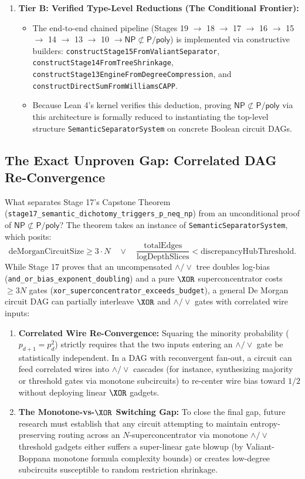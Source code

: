 \documentclass[11pt,a4paper]{article}
\theoremstyle{plain}
\theoremstyle{definition}
\theoremstyle{remark}
\newcommand{\lean}[1]{\texttt{\textcolor{slate}{#1}}}
\newcommand{\NP}{\mathsf{NP}}
\newcommand{\Ppoly}{\mathsf{P/poly}}
\begin{document}
\begin{enumerate}
\begin{itemize}[noitemsep]
    \end{itemize}
    \item \textbf{Tier B: Verified Type-Level Reductions (The Conditional Frontier):}
    \begin{itemize}[noitemsep]
        \item The end-to-end chained pipeline (Stages 19 $\to$ 18 $\to$ 17 $\to$ 16 $\to$ 15 $\to$ 14 $\to$ 13 $\to$ 10 $\to \NP \not\subset \Ppoly$) is implemented via constructive builders: \lean{constructStage15FromValiantSeparator}, \lean{constructStage14FromTreeShrinkage}, \lean{constructStage13EngineFromDegreeCompression}, and \lean{constructDirectSumFromWilliamsCAPP}.
        \item Because Lean 4's kernel verifies this deduction, proving $\NP \not\subset \Ppoly$ via this architecture is formally reduced to instantiating the top-level structure \lean{SemanticSeparatorSystem} on concrete Boolean circuit DAGs.
    \end{itemize}
\end{enumerate}

\subsection{The Exact Unproven Gap: Correlated DAG Re-Convergence}
What separates Stage 17's Capstone Theorem (\lean{stage17_semantic_dichotomy_triggers_p_neq_np}) from an unconditional proof of $\NP \not\subset \Ppoly$? The theorem takes an instance of \lean{SemanticSeparatorSystem}, which posits:
\begin{equation}
    \mathrm{deMorganCircuitSize} \ge 3 \cdot N \quad \lor \quad \frac{\mathrm{totalEdges}}{\mathrm{logDepthSlices}} < \mathrm{discrepancyHubThreshold}.
\end{equation}
While Stage 17 proves that an uncompensated $\land / \lor$ tree doubles log-bias (\lean{and_or_bias_exponent_doubling}) and a pure $\XOR$ superconcentrator costs $\ge 3N$ gates (\lean{xor_superconcentrator_exceeds_budget}), a general De Morgan circuit DAG can partially interleave $\XOR$ and $\land / \lor$ gates with correlated wire inputs:
\begin{enumerate}[noitemsep]
    \item \textbf{Correlated Wire Re-Convergence:} Squaring the minority probability ($p_{d+1} = p_d^2$) strictly requires that the two inputs entering an $\land / \lor$ gate be statistically independent. In a DAG with reconvergent fan-out, a circuit can feed correlated wires into $\land / \lor$ cascades (for instance, synthesizing majority or threshold gates via monotone subcircuits) to re-center wire bias toward $1/2$ without deploying linear $\XOR$ gadgets.
    \item \textbf{The Monotone-vs-$\XOR$ Switching Gap:} To close the final gap, future research must establish that any circuit attempting to maintain entropy-preserving routing across an $N$-superconcentrator via monotone $\land / \lor$ threshold gadgets either suffers a super-linear gate blowup (by Valiant-Boppana monotone formula complexity bounds) or creates low-degree subcircuits susceptible to random restriction shrinkage.
\end{enumerate}
\end{document}

